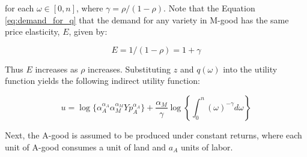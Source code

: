 for each $\omega \in [0, n]$, where $\gamma = \rho / (1 - \rho)$. Note that the Equation \eqref{eq:demand_for_q} that the demand for any variety in M-good has the same price elasticity, $E$, given by:

\begin{equation}
    E = 1 / (1 - \rho) = 1 + \gamma
\end{equation}

Thus $E$ increases as $\rho$ increases. Substituting $z$ and $q(\omega)$ into the utility function yields the following indirect utility function:

\begin{equation}
    u = \log\{\alpha_A^{\alpha_A} \alpha_M^{\alpha_M}Yp_A^{\alpha_A}\} + \frac{\alpha_M}{\gamma} \log \left\{ \int_0^n (\omega)^{-\gamma} d\omega \right\}
\end{equation}

Next, the A-good is assumed to be produced under constant returns, where each unit of A-good consumes a unit of land and $a_A$ units of labor.